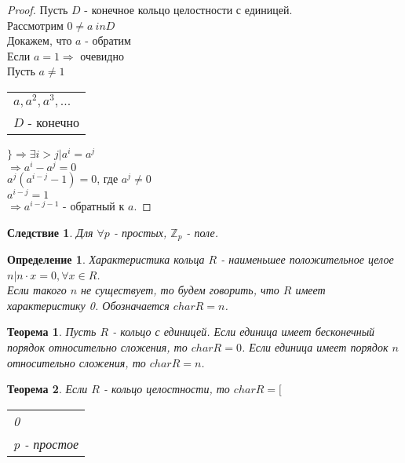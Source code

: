 \documentclass[10pt,a4paper]{article}
\newtheorem{definition}{Определение}
\newtheorem{theorem}{Теорема}
\newtheorem{corollary}{Следствие}
\newcommand*{\Z}{\mathbb{Z}}
\begin{document}
			\begin{proof}
				Пусть $D$ - конечное кольцо целостности с единицей.\\
				Рассмотрим $0 \neq a \ in D$\\
				Докажем, что $a$ - обратим\\
				Если $a = 1 \Rightarrow$ очевидно\\
				Пусть $a \neq 1$\\
				\begin{tabular}{l}
				$a, a^2, a^3, ...$\\
				$D$ - конечно			
				\end{tabular}
				$\Big\} \Rightarrow \exists i > j \big| a^i = a^j$\\
				$\Rightarrow a^i - a^j = 0$\\
				$a^j(a^{i-j}-1) = 0$, где $a^j \neq 0$\\
				$a^{i-j} = 1$\\
				$\Rightarrow a^{i-j-1}$ - обратный к $a$.
			\end{proof}
			\begin{corollary}
				Для $\forall p$ - простых, $\Z_p$ - поле.
			\end{corollary}
			\begin{definition}
				Характеристика кольца $R$ - наименьшее положительное целое $n \big| n \cdot x = 0, \forall x \in R$.\\
				Если такого $n$ не существует, то будем говорить, что $R$ имеет характеристику 0. Обозначается $char R = n$.
			\end{definition}
			\begin{theorem}
				Пусть $R$ - кольцо с единицей. Если единица имеет бесконечный порядок относительно сложения, то $char R = 0$. Если единица имеет порядок $n$ относительно сложения, то $char R = n$.
			\end{theorem}
			\begin{theorem}
				Если $R$ - кольцо целостности, то $char R = \Big[$
				\begin{tabular}{l}
				0\\
				p - простое
				\end{tabular}
			\end{theorem}
\end{document}
